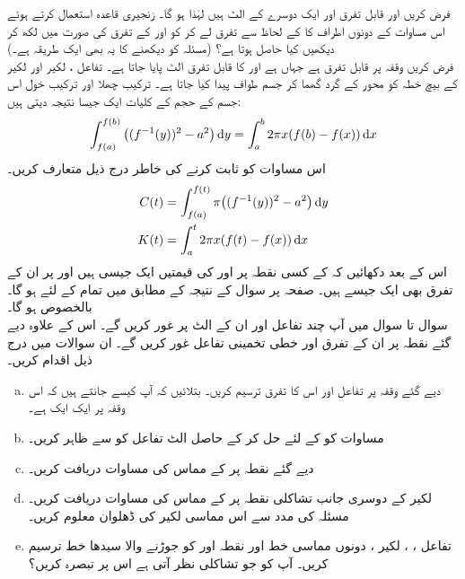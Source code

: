 فرض کریں  اور  قابل تفرق اور ایک دوسرے کے الٹ ہیں لہٰذا  ہو گا۔ زنجیری قاعدہ استعمال کرتے ہوئے اس مساوات کے دونوں اطراف کا  کے لحاظ سے  تفرق لے کر   کو  اور  کے تفرق کی صورت میں لکھ کر دیکھیں  کیا حاصل ہوتا ہے؟ (مسئلہ  کو دیکھنے کا یہ بھی ایک طریقہ ہے۔)
\\
فرض کریں وقفہ  پر  قابل تفرق ہے جہاں  ہے اور  کا قابل تفرق الٹ  پایا جاتا ہے۔ تفاعل ،  لکیر  اور لکیر  کے بیچ خطہ کو محور  کے گرد گھما کر جسم طواف پیدا کیا جاتا ہے۔ ترکیب چھلا اور ترکیب خول اس جسم کے حجم  کے کلیات ایک جیسا نتیجہ دیتی ہیں:
\begin{align*}
\int_{f(a)}^{f(b)}\big((f^{-1}(y))^2-a^2\big)\dif y=\int_a^b2\pi x(f(b)-f(x))\dif x
\end{align*}
اس مساوات کو ثابت کرنے کی خاطر درج ذیل متعارف کریں۔
\begin{align*}
C(t)&=\int_{f(a)}^{f(t)}\pi\big((f^{-1}(y))^2-a^2\big)\dif y\\
K(t)&=\int_a^t2\pi x(f(t)-f(x))\dif x
\end{align*}
اس کے بعد دکھائیں کہ  کے کسی نقطہ پر  اور  کی قیمتیں ایک جیسی ہیں اور  پر ان کے تفرق بھی ایک جیسے ہیں۔ صفحہ  پر سوال  کے نتیجہ کے  مطابق  میں تمام  کے لئے  ہو گا۔ بالخصوص  ہو گا۔
\\
سوال  تا سوال  میں آپ چند تفاعل اور ان کے الٹ پر غور کریں گے۔ اس کے علاوہ دیے گئے نقطہ پر ان کے تفرق اور خطی تخمینی تفاعل غور کریں گے۔ ان سوالات میں درج ذیل اقدام کریں۔ 
\begin{enumerate}[a.]
\item
دیے گئے وقفہ پر تفاعل  اور اس کا تفرق ترسیم کریں۔ بتلائیں کہ آپ کیسے جانتے ہیں کہ اس وقفہ پر  ایک ایک ہے۔
\item
مساوات  کو  کے لئے حل کر کے حاصل الٹ تفاعل کو  سے ظاہر کریں۔
\item
دیے گئے نقطہ  پر  کے مماس کی مساوات دریافت کریں۔
\item
لکیر  کے دوسری جانب تشاکلی نقطہ  پر  کے مماس کی مساوات دریافت کریں۔ مسئلہ  کی مدد سے اس مماسی لکیر کی ڈھلوان معلوم کریں۔
\item
تفاعل ، ، لکیر ، دونوں مماسی خط اور نقطہ  اور  کو جوڑنے والا سیدھا خط ترسیم کریں۔ آپ کو جو تشاکلی نظر آتی ہے اس پر تبصرہ کریں؟
\end{enumerate}
